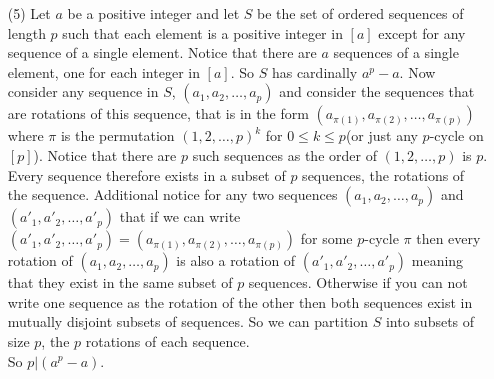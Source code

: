 \documentclass[12pt]{amsart}
\theoremstyle{definition}
\begin{document}
\begin{itemize}
\item[(5)] %
Let $a$ be a positive integer and let $S$ be the set of ordered sequences of length $p$ such that each element is a positive integer in $[a]$ except for any sequence of a single element. Notice that there are $a$ sequences of a single element, one for each integer in $[a]$. So $S$ has cardinally $a^p-a$. Now consider any sequence in $S$, $(a_1,a_2,\dots,a_p)$ and consider the sequences that are rotations of this sequence, that is in the form
$(a_{\pi(1)},a_{\pi(2)},\dots,a_{\pi(p)})$ where $\pi$ is the permutation $(1,2,\dots,p)^k$ for $0\leq k\leq p$(or just any $p$-cycle on $[p]$). Notice that there are $p$ such sequences as the order of $(1,2,\dots,p)$ is $p$. Every sequence therefore exists in a subset of $p$ sequences, the rotations of the sequence. Additional notice for any two sequences $(a_1,a_2,\dots,a_p)$ and $(a'_1,a'_2,\dots,a'_p)$ that if we can write $(a'_1,a'_2,\dots,a'_p) = (a_{\pi(1)},a_{\pi(2)},\dots,a_{\pi(p)})$ for some $p$-cycle $\pi$ then every rotation of $(a_1,a_2,\dots,a_p)$ is also a rotation of $(a'_1,a'_2,\dots,a'_p)$ meaning that they exist in the same subset of $p$ sequences. Otherwise if you can not write one sequence as the rotation of the other then both sequences exist in mutually disjoint subsets of sequences. So we can partition $S$ into subsets of size $p$, the $p$ rotations of each sequence.\\ So $p|(a^p-a)$.\\


\end{itemize}
\end{document}
